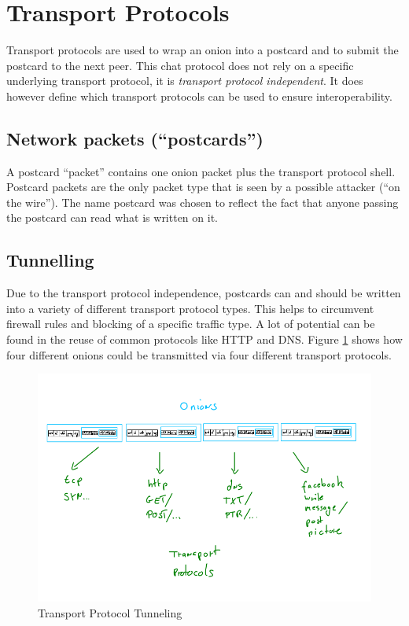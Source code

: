 \section{Transport Protocols}
Transport protocols are used to wrap an onion into a postcard
and to submit the postcard to the next peer.
This chat protocol does not rely on a specific underlying transport protocol,
it is \textit{transport protocol independent}. It does however define which
transport protocols can be used to ensure interoperability.
\subsection{Network packets ("`postcards"')}
\label{eofpostcard}
A postcard "`packet"' contains one onion packet plus the transport protocol
shell. Postcard packets are the only packet type that is seen by a possible
attacker ("`on the wire"'). 
The name postcard was chosen to reflect the fact that anyone
passing the postcard can read what is written on it.
\subsection{Tunnelling}
\label{tunneling}
Due to the transport protocol independence, postcards can and should
be written into a variety of different transport protocol types.
This helps to circumvent firewall rules and blocking of a specific
traffic type. A lot of potential can be found in the reuse of
common protocols like HTTP and DNS.\cite{rfc1034, rfc1035, rfc2616}
Figure \ref{tptunneling} shows how four different onions could be
transmitted via four different transport protocols.
\begin{figure}
    \centering
    \caption{Transport Protocol Tunneling}
    \label{tptunneling}
    \includegraphics[scale=0.8]{tp-tunneling.png}
\end{figure}
